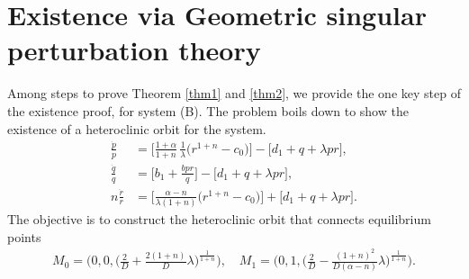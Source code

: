 \documentclass[graybox]{svmult}
\def\dpp{\dot{p}}
\def\dqq{\dot{q}}
\def\drr{\dot{r}}
\begin{document}
\section{Existence via Geometric singular perturbation theory} \label{sec:idea}

Among steps to prove Theorem \ref{thm1} and \ref{thm2}, we provide the one key step of the existence proof, for system (B). The problem boils down to show the existence of a heteroclinic orbit for the  system. 
\begin{equation} \label{eq:pqrsys}\tag{P}
\begin{aligned}
 \frac{\dpp}{p}&=\Big[\frac{1+\alpha}{1+n}\,\frac{1}{\lambda }\Big(r^{1+n}-c_0\Big)\Big] -\Big[d_1 + q + \lambda pr\Big],\\
 \frac{\dqq}{q}&=\Big[b_1 +\frac{bpr}{q}\Big] -\Big[d_1 + q + \lambda pr\Big],\\
 n\frac{\drr}{r}&=\Big[\frac{\alpha-n}{\lambda(1+n)}\Big(r^{1+n}-c_0\Big)\Big]+\Big[d_1 + q + \lambda pr\Big].
\end{aligned}
\end{equation}
The objective is to construct the heteroclinic orbit that connects equilibrium points
\begin{align*}
 M_0=\Big(0,0,\big(\frac{2}{D} + \frac{2(1+n)}{D} \lambda\big)^{\frac{1}{1+n}}\Big), \quad M_1=\Big(0,1,\big(\frac{2}{D} -\frac{(1+n)^2}{D(\alpha-n)} \lambda\big)^{\frac{1}{1+n}}\Big).
\end{align*}
\end{document}
